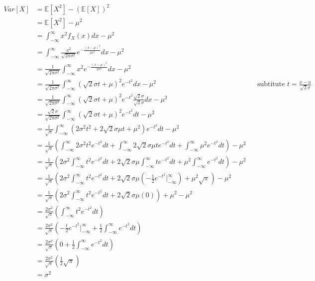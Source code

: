 \documentclass[11pt]{article}
\begin{document}
\begin{enumerate}[label=(\alph*)]
\begin{align*}
Var[X]& = \mathbb{E}[X^2]- (\mathbb{E}[X])^2 \\
&= \mathbb{E}[X^2]-\mu^2 \\
&= \int_{-\infty}^{\infty}x^2 f_X(x) dx-\mu^2 \\
&= \int_{-\infty}^{\infty}\frac{x^2}{\sqrt{2\pi\sigma^2}}e^{-\frac{(x-\mu)^2}{2\sigma^2}} dx -\mu^2 \\
&= \frac{1}{\sqrt{2\pi\sigma^2}}\int_{-\infty}^{\infty}x^2 e^{-\frac{(x-\mu)^2}{2\sigma^2}} dx -\mu^2 \\
&= \frac{1}{\sqrt{2\pi\sigma^2}}\int_{-\infty}^{\infty}(\sqrt{2}\sigma t+\mu)^2 e^{-t^2} dx -\mu^2 && \text{subtitute $t = \frac{x-u}{\sqrt{2}\sigma}$} \\
&= \frac{1}{\sqrt{2\pi\sigma^2}}\int_{-\infty}^{\infty}(\sqrt{2}\sigma t+\mu)^2 e^{-t^2} \frac{\sqrt{2}\sigma}{\sqrt{2}\sigma}dx -\mu^2 \\
&= \frac{\sqrt{2}\sigma}{\sqrt{2\pi\sigma^2}}\int_{-\infty}^{\infty}(\sqrt{2}\sigma t+\mu)^2 e^{-t^2} dt -\mu^2 \\
&= \frac{1}{\sqrt{\pi}}\int_{-\infty}^{\infty}(2\sigma^2 t^2+2\sqrt{2}\sigma\mu t+\mu^2) e^{-t^2} dt -\mu^2 \\
&= \frac{1}{\sqrt{\pi}}(\int_{-\infty}^{\infty}2\sigma^2 t^2 e^{-t^2} dt+\int_{-\infty}^{\infty}2\sqrt{2}\sigma\mu t e^{-t^2} dt+\int_{-\infty}^{\infty}\mu^2 e^{-t^2} dt) -\mu^2 \\
&= \frac{1}{\sqrt{\pi}}(2\sigma^2 \int_{-\infty}^{\infty}t^2 e^{-t^2} dt+2\sqrt{2}\sigma\mu \int_{-\infty}^{\infty}t e^{-t^2} dt+\mu^2\int_{-\infty}^{\infty} e^{-t^2} dt) -\mu^2 \\
&= \frac{1}{\sqrt{\pi}}(2\sigma^2 \int_{-\infty}^{\infty}t^2 e^{-t^2} dt+2\sqrt{2}\sigma\mu (-\frac{1}{2} e^{-t^2} \Big|_{-\infty}^{\infty})+\mu^2 \sqrt{\pi}) -\mu^2 \\
&= \frac{1}{\sqrt{\pi}}(2\sigma^2 \int_{-\infty}^{\infty}t^2 e^{-t^2} dt+2\sqrt{2}\sigma\mu (0))+\mu^2  -\mu^2 \\
&= \frac{2\sigma^2}{\sqrt{\pi}}( \int_{-\infty}^{\infty}t^2 e^{-t^2} dt) \\
&= \frac{2\sigma^2}{\sqrt{\pi}}( -\frac{t}{2}e^{-t^2}\Big|_{-\infty}^{\infty}+\frac{1}{2}\int_{-\infty}^{\infty} e^{-t^2} dt) \\
&= \frac{2\sigma^2}{\sqrt{\pi}}( 0+\frac{1}{2}\int_{-\infty}^{\infty} e^{-t^2} dt) \\
&= \frac{2\sigma^2}{\sqrt{\pi}}( \frac{1}{2}\sqrt{\pi}) \\
& = \sigma^2 \\
\end{align*}


\end{enumerate}
\end{document}
